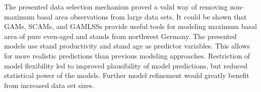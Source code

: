 The presented data selection mechanism proved a valid way of removing non-maximum basal area observations from large data sets.
It could be shown that GAMs, SCAMs, and GAMLSSs provide useful tools for modeling maximum basal area of pure even-aged \Beech{} and \Spruce{} stands from northwest Germany.
The presented models use stand productivity and stand age as predictor variables.
This allows for more realistic predictions than previous modeling approaches.
Restriction of model flexibility led to improved plausibility of model predictions, but reduced statistical power of the models.  
Further model refinement would greatly benefit from increased data set sizes.

